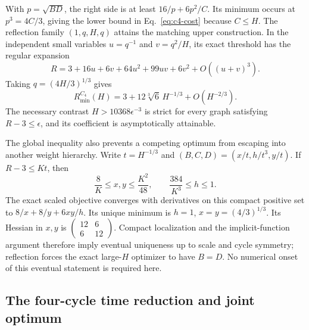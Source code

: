 \documentclass[aps,pre,reprint,amsmath,amssymb,longbibliography]{revtex4-2}
\begin{document}
With \(p=\sqrt{BD}\), the right side is at least
\(16/p+6p^2/C\). Its minimum occurs at \(p^3=4C/3\), giving
the lower bound in Eq.~\eqref{eq:c4-cost} because \(C\le H\).
The reflection family \((1,q,H,q)\) attains the matching upper
construction. In the independent small variables \(u=q^{-1}\) and
\(v=q^2/H\), its exact threshold has the regular expansion
\begin{equation}
 R=3+16u+6v+64u^2+99uv+6v^2+O((u+v)^3).
 \label{eq:app-c4-expansion}
\end{equation}
Taking \(q=(4H/3)^{1/3}\) gives
\begin{equation}
 R_{\min}^{C_4}(H)=3+12\sqrt[3]6\,H^{-1/3}+O(H^{-2/3}).
 \label{eq:c4-optimum}
\end{equation}
The necessary contrast \(H>10368\epsilon^{-3}\) is strict for
every graph satisfying \(R-3\le\epsilon\), and its coefficient is
asymptotically attainable.

The global inequality also prevents a competing optimum from escaping
into another weight hierarchy. Write \(t=H^{-1/3}\) and
\((B,C,D)=(x/t,h/t^3,y/t)\). If \(R-3\le Kt\), then
\begin{equation}
 \frac8K\le x,y\le\frac{K^2}{48},\qquad
 \frac{384}{K^3}\le h\le1.
 \label{eq:app-c4-localization}
\end{equation}
The exact scaled objective converges with derivatives on this compact
positive set to \(8/x+8/y+6xy/h\). Its unique minimum is
\(h=1\), \(x=y=(4/3)^{1/3}\). Its Hessian in \(x,y\) is
\(\left(\begin{smallmatrix}12&6\\6&12\end{smallmatrix}\right)\).
Compact localization and the implicit-function argument therefore imply
eventual uniqueness up to scale and cycle symmetry; reflection forces
the exact large-\(H\) optimizer to have \(B=D\). No numerical
onset of this eventual statement is required here.

\subsection{The four-cycle time reduction and joint optimum}
\end{document}
